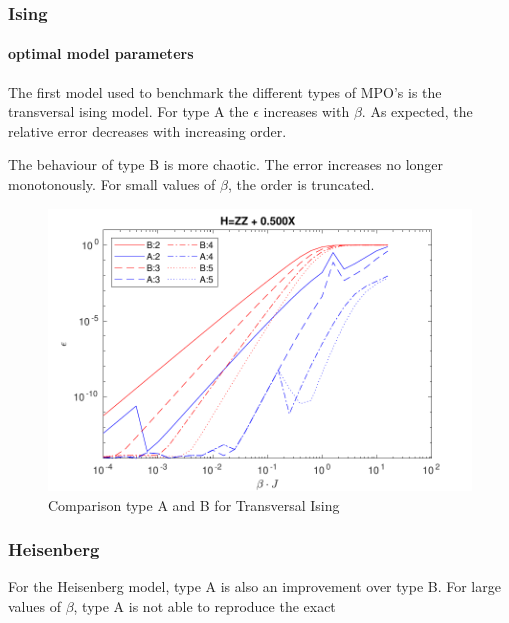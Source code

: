 \subsubsection{Ising}


\paragraph{optimal model parameters}



The first model used to benchmark the different types of MPO's is the transversal ising model. For type A the $\epsilon$ increases with
$\beta$. As expected, the relative error decreases with increasing order.

The behaviour of type B is more chaotic. The error increases no longer monotonously. For small values of $\beta$, the order is truncated.


\begin{figure}[H]
    \center
    \includegraphics[width=\textwidth]{Figuren/benchmarking/t_ising.pdf}
    \caption{Comparison type A and B for Transversal Ising}
    \label{fig:benchmark:tising}
\end{figure}

\subsubsection{Heisenberg}

For the Heisenberg model, type A is also an improvement over type B. For large values of $\beta$, type A is not able to reproduce the exact


